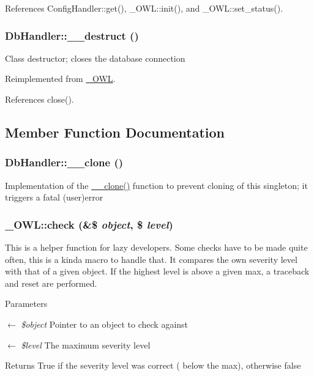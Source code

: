 References ConfigHandler::get(), \_\-OWL::init(), and \_\-OWL::set\_\-status().

\subsubsection[{\_\-\_\-destruct}]{\setlength{\rightskip}{0pt plus 5cm}DbHandler::\_\-\_\-destruct ()}\label{classDbHandler_a7cd6bd727d1f296eb5dbfae6ca36ab3f}
Class destructor; closes the database connection 

Reimplemented from \hyperlink{class__OWL_a44fd2222476a3109286cc82d92b6bbcc}{\_\-OWL}.



References close().



\subsection{Member Function Documentation}
\subsubsection[{\_\-\_\-clone}]{\setlength{\rightskip}{0pt plus 5cm}DbHandler::\_\-\_\-clone ()}\label{classDbHandler_ada20e62b915bc87a1de28389a2ee81e1}
Implementation of the \hyperlink{classDbHandler_ada20e62b915bc87a1de28389a2ee81e1}{\_\-\_\-clone()} function to prevent cloning of this singleton; it triggers a fatal (user)error 
\subsubsection[{check}]{\setlength{\rightskip}{0pt plus 5cm}\_\-OWL::check (\&\$ {\em object}, \/  \$ {\em level})}\label{class__OWL_ad6f4f6946f40199dd0333cf219fa500e}
This is a helper function for lazy developers. Some checks have to be made quite often, this is a kinda macro to handle that. It compares the own severity level with that of a given object. If the highest level is above a given max, a traceback and reset are performed.


\begin{DoxyParams}{Parameters}
\item[\mbox{$\leftarrow$} {\em \$object}]Pointer to an object to check against \item[\mbox{$\leftarrow$} {\em \$level}]The maximum severity level \end{DoxyParams}
\begin{DoxyReturn}{Returns}
True if the severity level was correct ( below the max), otherwise false 
\end{DoxyReturn}


